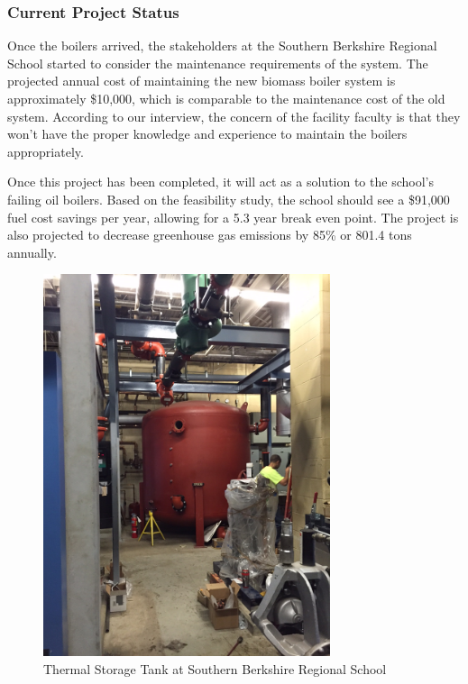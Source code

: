 \subsubsection{Current Project Status}
\par Once the boilers arrived, the stakeholders at the Southern Berkshire Regional School started to consider the maintenance requirements of the system. The projected annual cost of maintaining the new biomass boiler system is approximately \$10,000, which is comparable to the maintenance cost of the old system. According to our interview, the concern of the facility faculty is that they won't have the proper knowledge and experience to maintain the boilers appropriately.
\par Once this project has been completed, it will act as a solution to the school's failing oil boilers. Based on the feasibility study, the school should see a \$91,000 fuel cost savings per year, allowing for a 5.3 year break even point. The project is also projected to decrease greenhouse gas emissions by 85\% or 801.4 tons annually.
\begin{figure}[H]
\centering
\includegraphics[width=0.75\textwidth, angle=-90]{findingschapter/southernberkshirethermalstorage}
\caption{Thermal Storage Tank at Southern Berkshire Regional School}
\label{fig:sbrstank}
\end{figure}


